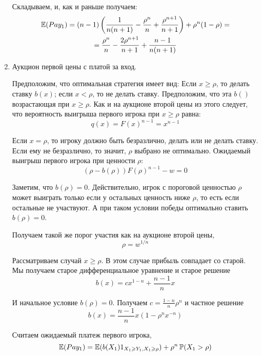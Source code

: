 \begin{enumerate}
Складываем, и, как и раньше получаем:
\begin{multline}
\operatorname{\mathbb{E}}(Pay_{1})=(n-1)\left(\frac{1}{n(n+1)}-\frac{\rho^{n}}{n}+\frac{\rho^{n+1}}{n+1}\right)+\rho^{n}(1-\rho)=\\
=\frac{\rho^{n}}{n}-\frac{2\rho^{n+1}}{n+1}+\frac{n-1}{n(n+1)}
\end{multline}

\item Аукцион первой цены с платой за вход.

Предположим, что оптимальная стратегия имеет вид: Если $ x\geq \rho $, то делать ставку $ b(x) $; если $ x<\rho $, то не делать ставку. Предположим, что эта $ b() $ возрастающая при $ x\geq \rho $. Как и на аукционе второй цены из этого следует, что вероятность выигрыша первого игрока при $ x\geq\rho $ равна:
\begin{equation}
q(x)=F(x)^{n-1}=x^{n-1}
\end{equation}


Если $ x=\rho $, то игроку должно быть безразлично, делать или не делать ставку. Если ему не безразлично, то значит, $ \rho $ выбрано не оптимально. Ожидаемый выигрыш первого игрока при ценности $ \rho $:
\begin{equation}
(\rho-b(\rho))F(\rho)^{n-1}-w=0
\end{equation}

Заметим, что $ b(\rho)=0 $. Действительно, игрок с пороговой ценностью $ \rho $ может выиграть только если у остальных ценность ниже $ \rho $, то есть если остальные не участвуют. А при таком условии победы оптимально ставить $ b(\rho)=0 $.

Получаем такой же порог участия как на аукционе второй цены,
\begin{equation}
\rho=w^{1/n}
\end{equation}

Рассматриваем случай $ x\geq \rho $. В этом случае прибыль совпадает со старой. Мы получаем старое дифференциальное уравнение и старое решение
\begin{equation}
b(x)=cx^{1-n}+\frac{n-1}{n}x
\end{equation}

И начальное условие $ b(\rho)=0 $. Получаем $ c=\frac{1-n}{n}\rho^{n} $ и частное решение
\begin{equation}
b(x)=\frac{n-1}{n}x(1-\rho^{n}x^{-n})
\end{equation}

Считаем ожидаемый платеж первого игрока,
\begin{equation}
\operatorname{\mathbb{E}}(Pay_{1})=\operatorname{\mathbb{E}}(b(X_{1})1_{X_{1}\geqslant Y_{1},X_{1}\geqslant \rho})+\rho^{n}\operatorname{\mathbb{P}}(X_{1}>\rho)
\end{equation}


\end{enumerate}

